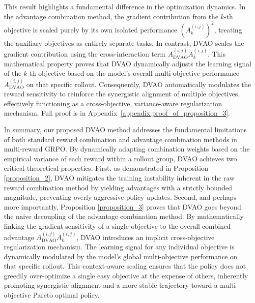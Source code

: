 This result highlights a fundamental difference in the optimization dynamics. In the advantage combination method, the gradient contribution from the $k$-th objective is scaled purely by its own isolated performance $\left(A_k^{(i,j)}\right)^2$, treating the auxiliary objectives as entirely separate tasks. In contrast, DVAO scales the gradient contribution using the cross-interaction term $A_\text{DVAO}^{(i,j)} A_k^{(i,j)}$. This mathematical property proves that DVAO dynamically adjusts the learning signal of the $k$-th objective based on the model's overall multi-objective performance $A_\text{DVAO}^{(i,j)}$ on that specific rollout. Consequently, DVAO automatically modulates the reward sensitivity to reinforce the synergistic alignment of multiple objectives, effectively functioning as a cross-objective, variance-aware regularization mechanism. Full proof is in Appendix~\ref{appendix:proof_of_proposition_3}.

In summary, our proposed DVAO method addresses the fundamental limitations of both standard reward combination and advantage combination methods in multi-reward GRPO. By dynamically adapting combination weights based on the empirical variance of each reward within a rollout group, DVAO achieves two critical theoretical properties. First, as demonstrated in Proposition \ref{proposition_2}, DVAO mitigates the training instability inherent in the raw reward combination method by yielding advantages with a strictly bounded magnitude, preventing overly aggressive policy updates. Second, and perhaps more importantly, Proposition \ref{proposition_3} proves that DVAO goes beyond the naive decoupling of the advantage combination method. By mathematically linking the gradient sensitivity of a single objective to the overall combined advantage $A_\text{DVAO}^{(i,j)} A_k^{(i,j)}$, DVAO introduces an implicit cross-objective regularization mechanism. The learning signal for any individual objective is dynamically modulated by the model's global multi-objective performance on that specific rollout. This context-aware scaling ensures that the policy does not greedily over-optimize a single easy objective at the expense of others, inherently promoting synergistic alignment and a more stable trajectory toward a multi-objective Pareto optimal policy.
 